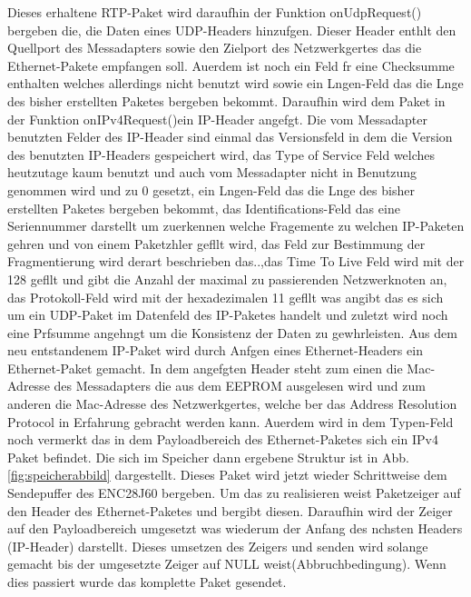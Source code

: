 \documentclass[a4paper]{book}%
\begin{document}
Dieses erhaltene RTP-Paket wird daraufhin der Funktion onUdpRequest() bergeben die, die Daten eines UDP-Headers hinzufgen. Dieser Header enthlt den Quellport des Messadapters sowie den Zielport des Netzwerkgertes das die Ethernet-Pakete empfangen soll. Auerdem ist noch ein Feld fr eine Checksumme enthalten welches allerdings nicht benutzt wird sowie ein Lngen-Feld das die Lnge des bisher erstellten Paketes bergeben bekommt. Daraufhin wird dem Paket in der Funktion onIPv4Request()ein IP-Header angefgt. Die vom Messadapter benutzten Felder des IP-Header sind  einmal das Versionsfeld in dem die Version des benutzten IP-Headers gespeichert wird, das Type of Service Feld welches heutzutage kaum benutzt und auch vom Messadapter nicht in Benutzung genommen wird und zu 0 gesetzt, ein Lngen-Feld das die Lnge des bisher erstellten Paketes bergeben bekommt, das  Identifications-Feld das eine Seriennummer darstellt um zuerkennen welche Fragemente zu welchen IP-Paketen gehren und von einem Paketzhler gefllt wird, das Feld zur Bestimmung der Fragmentierung wird derart beschrieben das..,das Time To Live Feld wird mit der 128 gefllt und gibt die Anzahl der maximal zu passierenden Netzwerknoten an, das Protokoll-Feld wird mit der hexadezimalen 11 gefllt was angibt das es sich um ein UDP-Paket im Datenfeld des IP-Paketes handelt und zuletzt wird noch eine Prfsumme angehngt um die Konsistenz der Daten zu gewhrleisten. Aus dem neu entstandenem IP-Paket wird durch Anfgen eines Ethernet-Headers ein Ethernet-Paket gemacht. In dem angefgten Header steht zum einen die Mac-Adresse des Messadapters die aus dem EEPROM ausgelesen wird und zum anderen die Mac-Adresse des Netzwerkgertes, welche ber das Address Resolution Protocol in Erfahrung gebracht werden kann. Auerdem wird in dem Typen-Feld noch vermerkt das in dem Payloadbereich des Ethernet-Paketes sich ein IPv4 Paket befindet.
Die sich im Speicher dann ergebene Struktur ist in Abb. \ref{fig:speicherabbild} dargestellt.
Dieses Paket wird jetzt wieder Schrittweise dem Sendepuffer des ENC28J60 bergeben. Um das zu realisieren weist  Paketzeiger auf den Header des Ethernet-Paketes und bergibt diesen. Daraufhin wird der Zeiger auf den Payloadbereich umgesetzt was wiederum der Anfang des nchsten Headers (IP-Header) darstellt. Dieses umsetzen des Zeigers und senden wird solange gemacht bis der umgesetzte Zeiger auf NULL weist(Abbruchbedingung). Wenn dies passiert wurde das komplette Paket gesendet.
\end{document}
